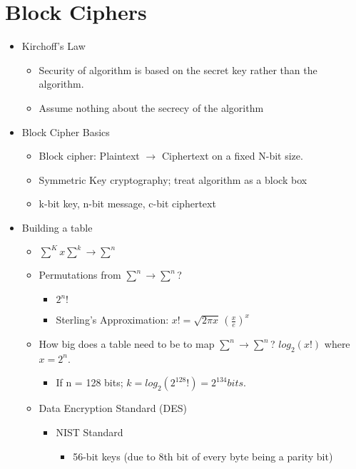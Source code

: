 \section{Block Ciphers}
\begin{itemize}
\item Kirchoff's Law
    \begin{itemize}
    \item Security of algorithm is based on the secret key rather than the algorithm.
    \item Assume nothing about the secrecy of the algorithm
    \end{itemize}
\item Block Cipher Basics
    \begin{itemize}
    \item Block cipher: Plaintext $\rightarrow$ Ciphertext on a fixed N-bit size. 
    \item Symmetric Key cryptography; treat algorithm as a block box
    \item k-bit key, n-bit message, c-bit ciphertext
    \end{itemize}
\item Building a table
    \begin{itemize}
    \item $\sum^K x \sum^k \rightarrow \sum^n$
    \item Permutations from $\sum^n \rightarrow \sum^n$?
        \begin{itemize}
        \item $2^n!$
        \item Sterling's Approximation: $x! = \sqrt{2\pi x}\,(\frac{x}{e})^x $
        \end{itemize}
    \item How big does a table need to be to map $\sum^n \rightarrow \sum^n$? $log_2(x!)$ where $x = 2^n$.
        \begin{itemize}
        \item If n = 128 bits; $k = log_2(2^{128}!) = 2^{134} bits.$
        \end{itemize}
    \end{itemize}
\begin{itemize}
\item Data Encryption Standard (DES)
    \begin{itemize}
    \item NIST Standard
        \begin{itemize}
        \item 56-bit keys (due to 8th bit of every byte being a parity bit)

\end{itemize}
\end{itemize}
\end{itemize}
\end{itemize}
